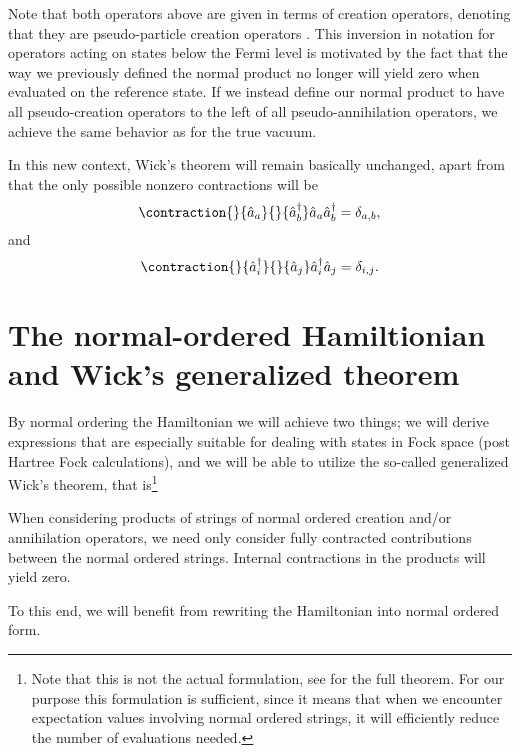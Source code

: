 Note that both operators above are given in terms of creation
operators, denoting that they are pseudo-particle creation operators
\cite{ShavittBartlett2009}.  This inversion in notation for operators
acting on states below the Fermi level is motivated by the fact that
the way we previously defined the normal product no longer will 
yield zero when evaluated on the reference state. If we instead define
our normal product to have all pseudo-creation operators to the left
of all pseudo-annihilation operators, we achieve the same behavior as
for the true vacuum.

In this new context, Wick's theorem will remain basically unchanged,
apart from that the only possible nonzero contractions will be
\begin{equation}
\contraction{}{\hat{a}_a}{}{\hat{a}_b^\dagger}
\hat{a}_a \hat{a}_b^\dagger = \delta_{a,b},
\label{eqn:nnz_contractions_1}
\end{equation}
and
\begin{equation}
\contraction{}{\hat{a}_i^\dagger}{}{\hat{a}_j}
\hat{a}_i^\dagger \hat{a}_j = \delta_{i,j}.
\label{eqn:nnz_contractions_2}
\end{equation}


\section{The normal-ordered Hamiltionian and Wick's generalized theorem}

By normal ordering the Hamiltonian we will achieve two things; we will
derive expressions that are especially suitable for dealing with states
 in Fock space (post Hartree Fock calculations), and we will
be able to utilize the so-called generalized Wick's theorem, that is\footnote{Note that this is not the actual formulation, see \cite[p.86]{ShavittBartlett2009} for the full theorem. For our purpose this formulation is sufficient, since it means that when we encounter expectation values involving normal ordered strings, it will efficiently reduce the number of evaluations needed.}
\begin{theorem}
When considering products of strings of normal ordered creation and/or annihilation operators, we need only consider fully contracted contributions between the normal ordered strings. Internal contractions in the products will yield zero.
\end{theorem}

To this end, we will benefit from rewriting the Hamiltonian into normal ordered form.

